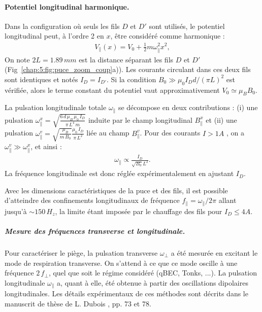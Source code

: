 \paragraph{Potentiel longitudinal harmonique.}
Dans la configuration où seuls les fils $D$ et $D'$ sont utilisés, le potentiel longitudinal peut, à l’ordre 2 en $x$, être considéré comme harmonique :
\begin{eqnarray}\label{chap5:eq.pot.long.1}
	V_\parallel (x) = V_0 + \frac{1}{2} m \omega_\parallel^2 x^2 ,
\end{eqnarray}
On note  $2L=1.89 \,mm$ est la distance séparant les fils $D$ et $D'$ (Fig~\ref{chap:5:fig:puce_zoom_coup}a)). Les courants circulant dans ces deux fils sont identiques et notés $I_D = I_{D'}$. Si la condition $B_0 \gg \mu_0 I_D d /(\pi L)^2 $ est vérifiée, alors le terme constant du potentiel vaut approximativement $V_0 \simeq \mu_B B_0$.

\medskip

La pulsation longitudinale totale $\omega_\parallel$ se décompose en deux contributions\cite{jacqm2012} : (i) une pulsation $\omega_\parallel^x = \sqrt{\frac{6\, d \, \mu_B \, \mu_0 \,I_D }{\pi \, L^4 \, m}}$ induite par le champ longitudinal $B_\parallel^x$ et (ii) une pulsation $\omega_\parallel^v = \sqrt{\frac{\mu_B }{m \, B_0}}\frac{\mu_0 \, I_D }{\pi \, L^2}$ liée au champ  $B_\parallel^v$. Pour des courants $I>1A$ , on a $\omega_\parallel^v \gg \omega_\parallel^x$, et ainsi :  
\begin{eqnarray*}
	\omega_\parallel \propto \frac{I_D}{\sqrt{B_0} L^2}.
\end{eqnarray*} 
La fréquence longitudinale est donc réglée expérimentalement en ajustant $I_D$.

\medskip

Avec les dimensions caractéristiques de la puce et des fils, il est possible d’atteindre des confinements longitudinaux de fréquence $f_\parallel = \omega_\parallel/ 2 \pi$ allant jusqu’à $\sim 150 \, H_z$, la limite étant imposée par le chauffage des fils pour $I_D \leq 4 A$.
 
 \medskip
 
\subparagraph{Mesure des fréquences transverse et longitudinale.}
Pour caractériser le piège, la pulsation transverse $\omega_\perp$ a été mesurée en excitant le mode de respiration transverse. On s'attend à ce que ce mode oscille à une fréquence $2 \, f_\perp$, quel que soit le régime considéré (\gls{qBEC}, Tonks, ...)\cite{PhysRevA.54.R1753}. La pulsation longitudinale $\omega_\parallel$ a, quant à elle, été obtenue à partir des oscillations dipolaires longitudinales. Les détails expérimentaux de ces méthodes sont décrits dans le manuscrit de thèse de L. Dubois \cite{L.Dubois2024}, pp. 73 et 78.


